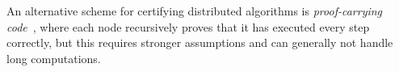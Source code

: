 



An alternative scheme for certifying distributed algorithms is \emph{proof-carrying code}~\cite{Necula11,bitansky2013recursive},
where each node recursively proves that it has executed every step correctly,
but this requires stronger assumptions and can generally not handle long computations.
